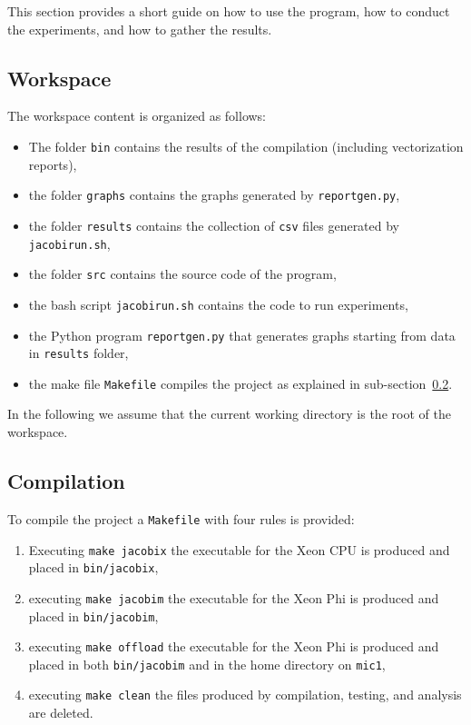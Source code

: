This section provides a short guide on how to use the program, how to conduct the experiments, and how to gather the results.

\subsection{Workspace}
The workspace content is organized as follows:
\begin{itemize}
	\item The folder \verb|bin| contains the results of the compilation (including vectorization reports),
	\item the folder \verb|graphs| contains the graphs generated by \verb|reportgen.py|,
	\item the folder \verb|results| contains the collection of \verb|csv| files generated by \verb|jacobirun.sh|,
	\item the folder \verb|src| contains the source code of the program,
	\item the bash script \verb|jacobirun.sh| contains the code to run experiments,
	\item the Python program \verb|reportgen.py| that generates graphs starting from data in \verb|results| folder,
	\item the make file \verb|Makefile| compiles the project as explained in sub-section~\ref{subsec:compilation}.
\end{itemize}

In the following we assume that the current working directory is the root of the workspace.

\subsection{Compilation}\label{subsec:compilation}
To compile the project a \verb|Makefile| with four rules is provided:
\begin{enumerate}
	\item Executing \verb|make jacobix| the executable for the Xeon CPU is produced and placed in \verb|bin/jacobix|,
	\item executing \verb|make jacobim| the executable for the Xeon Phi is produced and placed in \verb|bin/jacobim|,
	\item executing \verb|make offload| the executable for the Xeon Phi is produced and placed in both \verb|bin/jacobim| and in the home directory on \verb|mic1|,
	\item executing \verb|make clean| the files produced by compilation, testing, and analysis are deleted.
\end{enumerate}

